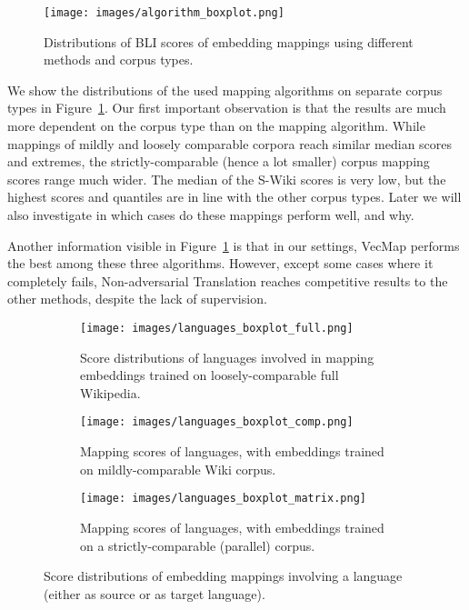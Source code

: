 \documentclass[11pt]{article}
\begin{document}
    \begin{figure}[tbp]
        \centering
        \texttt{[image: images/algorithm\_boxplot.png]}
        \caption{Distributions of BLI scores of embedding mappings using different methods and corpus types.}
        \label{fig:algorithm_boxplot}
    \end{figure}
    
    
    We show the distributions of the used mapping algorithms on separate corpus types in Figure~\ref{fig:algorithm_boxplot}. Our first important observation is that the results are much more dependent on the corpus type than on the mapping algorithm. While mappings of mildly and loosely comparable corpora reach similar median scores and extremes, the strictly-comparable (hence a lot smaller) corpus mapping scores range much wider. The median of the S-Wiki scores is very low, but the highest scores and quantiles are in line with the other corpus types. Later we will also investigate in which cases do these mappings perform well, and why.
    
    Another information visible in Figure~\ref{fig:algorithm_boxplot} is that in our settings, VecMap performs the best among these three algorithms. However, except some cases where it completely fails, Non-adversarial Translation reaches competitive results to the other methods, despite the lack of supervision.
    
       
    \begin{figure}[htbp]
         \centering
         \begin{subfigure}[b]{0.5\textwidth}
             \centering
             \texttt{[image: images/languages\_boxplot\_full.png]}
             \caption{Score distributions of languages involved in mapping embeddings trained on loosely-comparable full Wikipedia.}
             \label{lang_boxplot}
         \end{subfigure}
         \hfill
         \begin{subfigure}[b]{0.5\textwidth}
             \centering
             \texttt{[image: images/languages\_boxplot\_comp.png]}
             \caption{Mapping scores of languages, with embeddings trained on mildly-comparable Wiki corpus.}
             \label{mildly}
         \end{subfigure}
         \hfill
         \begin{subfigure}[b]{0.5\textwidth}
             \centering
             \texttt{[image: images/languages\_boxplot\_matrix.png]}
             \caption{Mapping scores of languages, with embeddings trained on a strictly-comparable (parallel) corpus.}
         \end{subfigure}
        \caption{Score distributions of embedding mappings involving a language (either as source or as target language).}
        \label{fig:two graphs}
    \end{figure}
\end{document}
